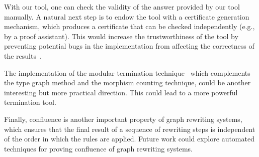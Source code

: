 \documentclass{report}
\begin{document}
With our tool, one can check the validity of the answer provided by our tool manually. A natural next step is to endow the tool with a certificate generation mechanism, which produces a certificate that can be checked independently (e.g., by a proof assistant). This would increase the trustworthiness of the tool by preventing potential bugs in the implementation from affecting the correctness of the results~\cite{contejean2007certification,contejean2010a3pat}.

The implementation of the modular termination technique~\cite{plump2018modular} which complements the type graph method and the morphism counting technique, could be another interesting but more practical direction. This could lead to a more powerful termination tool.
   
Finally, confluence is another important property of graph rewriting systems, which ensures that the final result of a sequence of rewriting steps is independent of the order in which the rules are applied. Future work could explore automated techniques for proving confluence of graph rewriting systems.

\printbibliography
\end{document}
